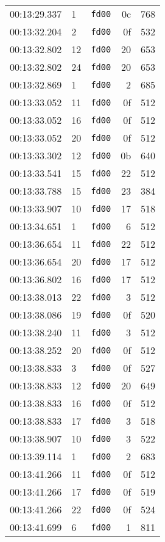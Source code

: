 \documentclass{article}
\begin{document}
\begin{longtable}{lllrr}
00:13:29.337 & 1 & \texttt{fd00} & 0c & 768 \\
00:13:32.204 & 2 & \texttt{fd00} & 0f & 532 \\
00:13:32.802 & 12 & \texttt{fd00} & 20 & 653 \\
00:13:32.802 & 24 & \texttt{fd00} & 20 & 653 \\
00:13:32.869 & 1 & \texttt{fd00} & 2 & 685 \\
00:13:33.052 & 11 & \texttt{fd00} & 0f & 512 \\
00:13:33.052 & 16 & \texttt{fd00} & 0f & 512 \\
00:13:33.052 & 20 & \texttt{fd00} & 0f & 512 \\
00:13:33.302 & 12 & \texttt{fd00} & 0b & 640 \\
00:13:33.541 & 15 & \texttt{fd00} & 22 & 512 \\
00:13:33.788 & 15 & \texttt{fd00} & 23 & 384 \\
00:13:33.907 & 10 & \texttt{fd00} & 17 & 518 \\
00:13:34.651 & 1 & \texttt{fd00} & 6 & 512 \\
00:13:36.654 & 11 & \texttt{fd00} & 22 & 512 \\
00:13:36.654 & 20 & \texttt{fd00} & 17 & 512 \\
00:13:36.802 & 16 & \texttt{fd00} & 17 & 512 \\
00:13:38.013 & 22 & \texttt{fd00} & 3 & 512 \\
00:13:38.086 & 19 & \texttt{fd00} & 0f & 520 \\
00:13:38.240 & 11 & \texttt{fd00} & 3 & 512 \\
00:13:38.252 & 20 & \texttt{fd00} & 0f & 512 \\
00:13:38.833 & 3 & \texttt{fd00} & 0f & 527 \\
00:13:38.833 & 12 & \texttt{fd00} & 20 & 649 \\
00:13:38.833 & 16 & \texttt{fd00} & 0f & 512 \\
00:13:38.833 & 17 & \texttt{fd00} & 3 & 518 \\
00:13:38.907 & 10 & \texttt{fd00} & 3 & 522 \\
00:13:39.114 & 1 & \texttt{fd00} & 2 & 683 \\
00:13:41.266 & 11 & \texttt{fd00} & 0f & 512 \\
00:13:41.266 & 17 & \texttt{fd00} & 0f & 519 \\
00:13:41.266 & 22 & \texttt{fd00} & 0f & 524 \\
00:13:41.699 & 6 & \texttt{fd00} & 1 & 811 \\

\end{longtable}
\end{document}
